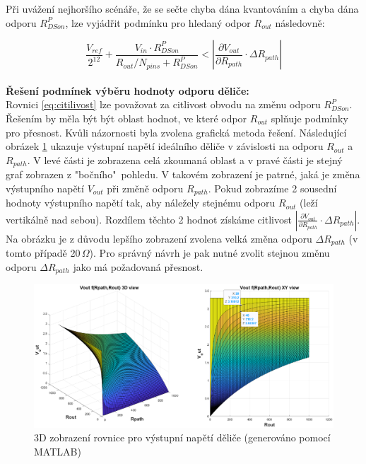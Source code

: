 Při uvážení nejhoršího scénáře, že se sečte chyba dána kvantováním a chyba dána odporu $R^P_{DSon}$, lze vyjádřit podmínku pro hledaný odpor
$R_{out}$ následovně:

\begin{equation}\label{eq:citilivost}
\frac{V_{ref}}{2^{12}} + \frac{V_{in} \cdot R^P_{DSon}}{R_{out}/N_{pins} + R^P_{DSon}} < \left| \frac{\partial V_{out} }{\partial R_{path}}\cdot \Delta R_{path} \right|
\end{equation}
\\
\textbf{Řešení podmínek výběru hodnoty odporu děliče:}\\
    Rovnici \ref{eq:citilivost} lze považovat za citlivost obvodu na změnu odporu $R^P_{DSon}$.
    Řešením by měla být být oblast hodnot, ve které odpor $R_{out}$ splňuje podmínky pro přesnost.
    Kvůli názornosti byla zvolena grafická metoda řešení.
    Následující obrázek \ref{fig:3D zobrazení rovnice pro výstupní napětí děliče}
    ukazuje výstupní napětí ideálního děliče v závislosti na odporu $R_{out}$ a $R_{path}$.
    V levé části je zobrazena celá zkoumaná oblast a v pravé části je stejný graf zobrazen z "bočního"\ pohledu.
    V takovém zobrazení je patrné, jaká je změna výstupního napětí $V_{out}$ při změně odporu $R_{path}$.
    Pokud zobrazíme 2 sousední hodnoty výstupního napětí tak, aby náležely stejnému odporu $R_{out}$ (leží vertikálně nad sebou).
    Rozdílem těchto 2 hodnot získáme citlivost
    $\left| \frac{\partial V_{out} }{\partial R_{path}}\cdot \Delta R_{path} \right|$.
    Na obrázku je z důvodu lepšího zobrazení zvolena velká změna odporu $\Delta R_{path}$
    (v tomto případě 20\,$\Omega$).
    Pro správný návrh je pak nutné zvolit stejnou změnu odporu $\Delta R_{path}$ jako má požadovaná přesnost\cite{Sensitivity_embedded,Sensitivity_2}.\\

\begin{figure}[ht!]
    \centering
    \includegraphics[width = 1\textwidth]{obrazky/Vout3D.eps}
    \caption{3D zobrazení rovnice pro výstupní napětí děliče (generováno pomocí MATLAB) }
    \label{fig:3D zobrazení rovnice pro výstupní napětí děliče}
\end{figure}

